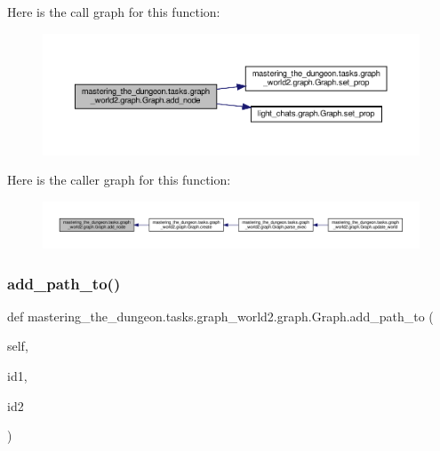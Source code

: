 Here is the call graph for this function\+:
\nopagebreak
\begin{figure}[H]
\begin{center}
\leavevmode
\includegraphics[width=350pt]{classmastering__the__dungeon_1_1tasks_1_1graph__world2_1_1graph_1_1Graph_a506ee7f9d07c8c6b63d59d73d50ffe72_cgraph}
\end{center}
\end{figure}
Here is the caller graph for this function\+:
\nopagebreak
\begin{figure}[H]
\begin{center}
\leavevmode
\includegraphics[width=350pt]{classmastering__the__dungeon_1_1tasks_1_1graph__world2_1_1graph_1_1Graph_a506ee7f9d07c8c6b63d59d73d50ffe72_icgraph}
\end{center}
\end{figure}
\mbox{\label{classmastering__the__dungeon_1_1tasks_1_1graph__world2_1_1graph_1_1Graph_a1eda56c20f83b99104e941902d828b04}} 
\subsubsection{\texorpdfstring{add\+\_\+path\+\_\+to()}{add\_path\_to()}}
{\footnotesize\ttfamily def mastering\+\_\+the\+\_\+dungeon.\+tasks.\+graph\+\_\+world2.\+graph.\+Graph.\+add\+\_\+path\+\_\+to (\begin{DoxyParamCaption}\item[{}]{self,  }\item[{}]{id1,  }\item[{}]{id2 }\end{DoxyParamCaption})}



